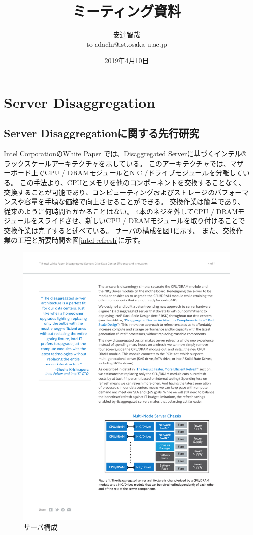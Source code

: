 \documentclass[a4j]{ujarticle}
\title{ミーティング資料}
\author{安達智哉\\to-adachi@ist.osaka-u.ac.jp}
\date{2019年4月10日}
\begin{document}
\maketitle



\section{Server Disaggregation}
\subsection{Server Disaggregationに関する先行研究}
Intel CorporationのWhite Paper \cite{DisaggregatedServersDriveDataCenterEfficiencyandInnovation}では、Disaggregated Serverに基づくインテル®ラックスケールアーキテクチャを示している。
このアーキテクチャでは、マザーボード上でCPU / DRAMモジュールとNIC /ドライブモジュールを分離している。
この手法より、CPUとメモリを他のコンポーネントを交換することなく、交換することが可能であり、コンピューティングおよびストレージのパフォーマンスや容量を手頃な価格で向上させることができる。
交換作業は簡単であり、従来のように何時間もかかることはない。
4本のネジを外してCPU / DRAMモジュールをスライドさせ、新しいCPU / DRAMモジュールを取り付けることで交換作業は完了すると述べている。
サーバの構成を図\ref{intel-server}に示す。
また、交換作業の工程と所要時間を図\ref{intel-refresh}に示す。

\begin{figure}[htbp]
  \centering
  \includegraphics[width=1.0\hsize]{intel-server.pdf}
  \caption{サーバ構成}
  \label{intel-server}
\end{figure}
\end{document}
